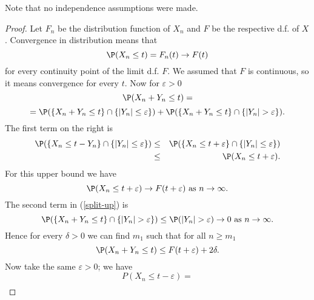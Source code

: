 Note that no independence assumptions were made.

\begin{proof}
Let $F_{n}$ be the distribution function of $X_{n}$ and $F$ be the
respective d.f. of $X$. Convergence in distribution means that 
\begin{equation*}
\P (X_{n}\leq t)=F_{n}(t)\rightarrow F(t)
\end{equation*}%
for every continuity point of the limit d.f. $F.$ We assumed that $F$ is
continuous, so it means convergence for every $t$. Now for $\varepsilon >0$%
\begin{equation*}
\P (X_{n}+Y_{n}\leq t)=
\end{equation*}%
\begin{equation}
=\P (\left\{ X_{n}+Y_{n}\leq t\right\} \cap \left\{ \left\vert
Y_{n}\right\vert \leq \varepsilon \right\} )+\P (\left\{ X_{n}+Y_{n}\leq
t\right\} \cap \left\{ \left\vert Y_{n}\right\vert >\varepsilon \right\} ).
\label{split-up}
\end{equation}%
The first term on the right is 
\begin{eqnarray*}
\P (\left\{ X_{n}\leq t-Y_{n}\right\} \cap \left\{ \left\vert
Y_{n}\right\vert \leq \varepsilon \right\} ) &\leq &\P (\left\{ X_{n}\leq
t+\varepsilon \right\} \cap \left\{ \left\vert Y_{n}\right\vert \leq
\varepsilon \right\} ) \\
&\leq &\P (X_{n}\leq t+\varepsilon ).
\end{eqnarray*}%
For this upper bound we have%
\begin{equation*}
\P (X_{n}\leq t+\varepsilon )\rightarrow F(t+\varepsilon )\text{ as }%
n\rightarrow \infty .
\end{equation*}%
The second term in (\ref{split-up}) is 
\begin{equation*}
\P (\left\{ X_{n}+Y_{n}\leq t\right\} \cap \left\{ \left\vert
Y_{n}\right\vert >\varepsilon \right\} )\leq \P (\left\vert
Y_{n}\right\vert >\varepsilon )\rightarrow 0\text{ as }n\rightarrow \infty .
\end{equation*}%
Hence for every $\delta >0$ we can find $m_{1}$ such that for all $n\geq
m_{1}$ 
\begin{equation}
\P (X_{n}+Y_{n}\leq t)\leq F(t+\varepsilon )+2\delta .  \label{bracket-1a}
\end{equation}%
Now take the same $\varepsilon >0$; we have 
\begin{equation*}
P(X_{n}\leq t-\varepsilon )=
\end{equation*}%
\begin{eqnarray*}

\end{eqnarray*}
\end{proof}
